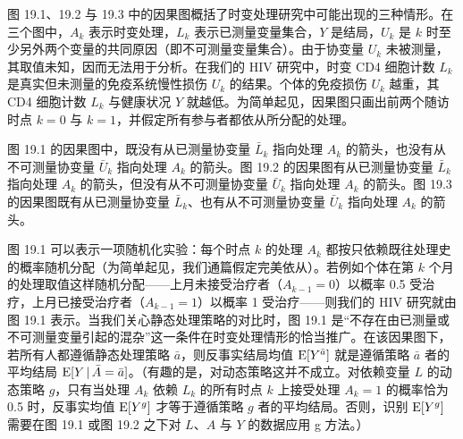 图 19.1、19.2 与 19.3 中的因果图概括了时变处理研究中可能出现的三种情形。在三个图中，$A_k$ 表示时变处理，$L_k$ 表示已测量变量集合，$Y$ 是结局，$U_k$ 是 $k$ 时至少另外两个变量的共同原因（即不可测量变量集合）。由于协变量 $U_k$ 未被测量，其取值未知，因而无法用于分析。在我们的 HIV 研究中，时变 CD4 细胞计数 $L_k$ 是真实但未测量的免疫系统慢性损伤 $U_k$ 的结果。个体的免疫损伤 $U_k$ 越重，其 CD4 细胞计数 $L_k$ 与健康状况 $Y$ 就越低。为简单起见，因果图只画出前两个随访时点 $k=0$ 与 $k=1$，并假定所有参与者都依从所分配的处理。

图 19.1 的因果图中，既没有从已测量协变量 $\bar{L}_k$ 指向处理 $A_k$ 的箭头，也没有从不可测量协变量 $\bar{U}_k$ 指向处理 $A_k$ 的箭头。图 19.2 的因果图有从已测量协变量 $\bar{L}_k$ 指向处理 $A_k$ 的箭头，但没有从不可测量协变量 $\bar{U}_k$ 指向处理 $A_k$ 的箭头。图 19.3 的因果图既有从已测量协变量 $\bar{L}_k$、也有从不可测量协变量 $\bar{U}_k$ 指向处理 $A_k$ 的箭头。

\begin{figure}[htbp]
\centering
{}
\caption{}
\label{fig:19.1}
\end{figure}

图 19.1 可以表示一项随机化实验：每个时点 $k$ 的处理 $A_k$ 都按只依赖既往处理史的概率随机分配（为简单起见，我们通篇假定完美依从）。若例如个体在第 $k$ 个月的处理取值这样随机分配——上月未接受治疗者（$A_{k-1}=0$）以概率 0.5 受治疗，上月已接受治疗者（$A_{k-1}=1$）以概率 1 受治疗——则我们的 HIV 研究就由图 19.1 表示。当我们关心静态处理策略的对比时，图 19.1 是“不存在由已测量或不可测量变量引起的混杂”这一条件在时变处理情形的恰当推广。在该因果图下，若所有人都遵循静态处理策略 $\bar{a}$，则反事实结局均值 $\mathrm{E}[Y^{\bar{a}}]$ 就是遵循策略 $\bar{a}$ 者的平均结局 $\mathrm{E}[Y\,|\, \bar{A}=\bar{a}]$。（有趣的是，对动态策略这并不成立。对依赖变量 $L$ 的动态策略 $g$，只有当处理 $A_k$ 依赖 $L_k$ 的所有时点 $k$ 上接受处理 $A_k=1$ 的概率恰为 0.5 时，反事实均值 $\mathrm{E}[Y^g]$ 才等于遵循策略 $g$ 者的平均结局。否则，识别 $\mathrm{E}[Y^g]$ 需要在图 19.1 或图 19.2 之下对 $L$、$A$ 与 $Y$ 的数据应用 g 方法。）

